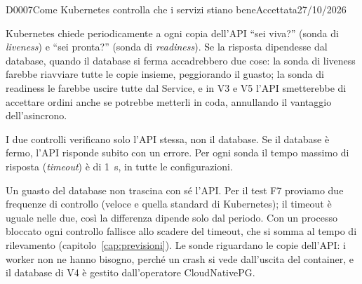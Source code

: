 \begin{decisione}{D0007}{Come Kubernetes controlla che i servizi stiano bene}{Accettata}{27/10/2026}

\contesto
Kubernetes chiede periodicamente a ogni copia dell'API ``sei viva?'' (sonda di \emph{liveness}) e ``sei pronta?'' (sonda di \emph{readiness}). Se la risposta dipendesse dal database, quando il database si ferma accadrebbero due cose: la sonda di liveness farebbe riavviare tutte le copie insieme, peggiorando il guasto; la sonda di readiness le farebbe uscire tutte dal Service, e in V3 e V5 l'API smetterebbe di accettare ordini anche se potrebbe metterli in coda, annullando il vantaggio dell'asincrono.

\scelta
I due controlli verificano solo l'API stessa, non il database. Se il database è fermo, l'API risponde subito con un errore. Per ogni sonda il tempo massimo di risposta (\emph{timeout}) è di 1~s, in tutte le configurazioni.

\conseguenze
Un guasto del database non trascina con sé l'API. Per il test F7 proviamo due frequenze di controllo (veloce e quella standard di Kubernetes); il timeout è uguale nelle due, così la differenza dipende solo dal periodo. Con un processo bloccato ogni controllo fallisce allo scadere del timeout, che si somma al tempo di rilevamento (capitolo~\ref{cap:previsioni}). Le sonde riguardano le copie dell'API: i worker non ne hanno bisogno, perché un crash si vede dall'uscita del container, e il database di V4 è gestito dall'operatore CloudNativePG.

\end{decisione}
